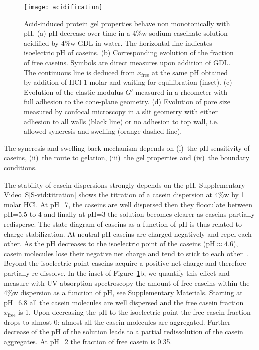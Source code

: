 \documentclass[twocolumn,superscriptaddress,showpacs,preprintnumbers, amsmath,amssymb,prl]{revtex4-1}
\begin{document}
\begin{figure}
	\texttt{[image: acidification]}%
	\caption{Acid-induced protein gel properties behave non monotonically with pH. (a) pH decrease over time in a 4\%w sodium caseinate solution acidified by 4\%w GDL in water. The horizontal line indicates isoelectric pH of caseins. (b) Corresponding evolution of the fraction of free caseins. Symbols are direct measures upon addition of GDL. The continuous line is deduced from $x_\text{free}$ at the same pH obtained by addition of HCl 1 molar and waiting for equilibration (inset). (c) Evolution of the elastic modulus $G'$ measured in a rheometer with full adhesion to the cone-plane geometry. (d) Evolution of pore size measured by confocal microscopy in a slit geometry with either adhesion to all walls (black line) or no adhesion to top wall, i.e. allowed syneresis and swelling (orange dashed line).}%
	\label{fig:acidification}
\end{figure}


The syneresis and swelling back mechanism depends on (i)~the pH sensitivity of caseins, (ii)~the route to gelation, (iii)~the gel properties and (iv)~the boundary conditions.

The stability of casein dispersions strongly depends on the pH. Supplementary Video~S\ref{S-vid:titration} shows the titration of a casein dispersion at 4\%w by 1 molar HCl. At pH=7, the caseins are well dispersed then they flocculate between pH=5.5 to 4 and finally at pH=3 the solution becomes clearer as caseins partially redisperse. The state diagram of caseins as a function of pH is thus related to charge stabilization. At neutral pH caseins are charged negatively and repel each other. As the pH decreases to the isoelectric point of the caseins (pH$\approx 4.6$), casein molecules lose their negative net charge and tend to stick to each other~\cite{Roefs1986,Bremer1989,Lucey1998,Dickinson2002}. Beyond the isoelectric point caseins acquire a positive net charge and therefore partially re-dissolve. In the inset of Figure~\ref{fig:acidification}b, we quantify this effect and measure with UV absorption spectroscopy the amount of free caseins within the 4\%w dispersion as a function of pH, see Supplementary Materials. Starting at pH=6.8 all the casein molecules are well dispersed and the free casein fraction $x_\text{free}$ is 1. Upon decreasing the pH to the isoelectric point the free casein fraction drops to almost 0: almost all the casein molecules are aggregated. Further decrease of the pH of the solution leads to a partial redissolution of the casein aggregates. At pH=2 the fraction of free casein is 0.35.
\end{document}

